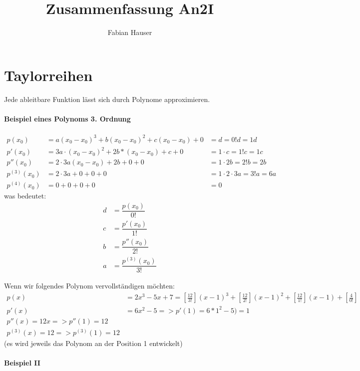 

\title{Zusammenfassung An2I}
\author{Fabian Hauser}
 

\maketitle

\section{Taylorreihen}
Jede ableitbare Funktion lässt sich durch Polynome approximieren.


\paragraph{Beispiel eines Polynoms 3. Ordnung}
\begin{align*}
	p(x_0) & = a(x_0-x_0)^3 + b(x_0-x_0)^2 + c(x_0-x_0) + 0 &= d = 0!d = 1d \\
	p'(x_0) &= 3a \cdot (x_0-x_0)^2 + 2b * (x_0-x_0) + c + 0 &= 1 \cdot c = 1!c = 1c \\
	p''(x_0) &= 2 \cdot 3a (x_0-x_0) + 2b + 0 + 0 &= 1 \cdot 2b = 2!b = 2b \\
	p^{(3)}(x_0) &= 2 \cdot 3a + 0 + 0 + 0 &= 1 \cdot 2 \cdot 3a = 3!a = 6a \\
	p^{(4)}(x_0) &= 0 + 0 + 0 + 0 &= 0
\end{align*}
was bedeutet:
\begin{align*}
	d &= \dfrac{p(x_0)}{0!} \\
	c &= \dfrac{p'(x_0)}{1!} \\
	b &= \dfrac{p''(x_0)}{2!} \\
	a &= \dfrac{p^{(3)}(x_0)}{3!}
\end{align*}

Wenn wir folgendes Polynom vervollständigen möchten:
\begin{align*}
	p(x) &= 2x^3 - 5x + 7 = [\frac{12}{3!}](x-1)^3 + [\frac{12}{2!}](x-1)^2 + [\frac{12}{1!}](x-1) + [\frac{4}{0!}] \\
	p'(x) &= 6x^2 - 5 => p'(1) = 6 * 1^2 -5 ) =1 \\
	p''(x) = 12x => p''(1) = 12 \\
	p^{(3)}(x) = 12 => p^{(3)}(1) = 12
\end{align*}
(es wird jeweils das Polynom an der Position 1 entwickelt)

\paragraph{Beispiel II}

